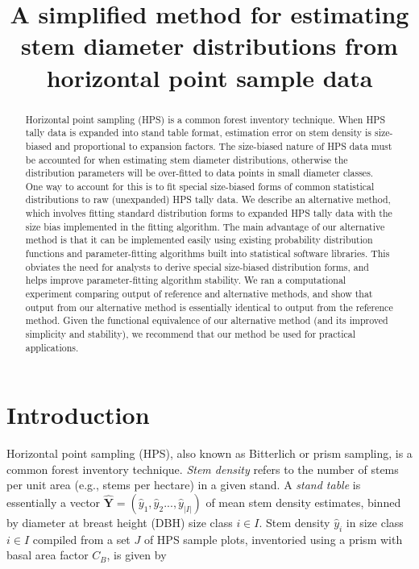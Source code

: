 \message{ !name(hpsdistfit_article.tex)}\documentclass{article}
\title{A simplified method for estimating stem diameter distributions from horizontal point sample data}
\author{}
\date{}
\begin{document}

\maketitle

\begin{abstract}
Horizontal point sampling (HPS) is a common forest inventory technique. 
When HPS tally data is expanded into stand table format, estimation error on stem density is size-biased and proportional to expansion factors. 
The size-biased nature of HPS data must be accounted for when estimating stem diameter distributions, otherwise the distribution parameters will be over-fitted to data points in small diameter classes. 
One way to account for this is to fit special size-biased forms of common statistical distributions to raw (unexpanded) HPS tally data. 
We describe an alternative method, which involves fitting standard distribution forms to expanded HPS tally data with the size bias implemented in the fitting algorithm. 
The main advantage of our alternative method is that it can be
implemented easily using existing probability distribution functions
and parameter-fitting algorithms built
into statistical software libraries.
This obviates the need for analysts to derive special size-biased
distribution forms, and helps improve parameter-fitting algorithm stability. 
We ran a computational experiment comparing output of reference and
alternative methods, and show that output from our alternative method
is essentially identical to output from the reference method. 
Given the functional equivalence of our alternative method (and its
improved simplicity and stability), we recommend that our method be
used for practical applications.
\end{abstract}

\linenumbers 
\doublespace 

\clearpage
\section{Introduction}
\label{sec:introduction}

Horizontal point sampling (HPS), also known as Bitterlich \citep{bitterlich1947winkelzahlmessung} or prism sampling, is a common forest inventory technique. 
\emph{Stem density} refers to the number of stems per unit area (e.g.,
stems per hectare) in a given stand. 
A \emph{stand table} is essentially a vector $\bm{\hat{Y}} = (\hat{y}_1, \hat{y}_2... , \hat{y}_{|I|})$ of mean stem density estimates, binned by diameter at breast height (DBH) size class $i \in I$. 
Stem density $\hat{y}_i$ in size class $i \in I$ compiled from a set $J$ of HPS sample plots, inventoried using a prism with basal area factor $C_B$, is given by
\end{document}
